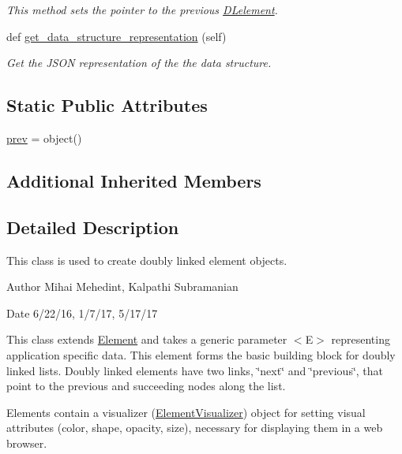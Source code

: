 \begin{DoxyCompactItemize}
\begin{DoxyCompactList}\small\item\em This method sets the pointer to the previous \mbox{\hyperlink{class_bridges_1_1_d_lelement_1_1_d_lelement}{D\+Lelement}}. \end{DoxyCompactList}\item 
def \mbox{\hyperlink{class_bridges_1_1_d_lelement_1_1_d_lelement_ab913276df8a2b51c2d944aaa5b8a9790}{get\+\_\+data\+\_\+structure\+\_\+representation}} (self)
\begin{DoxyCompactList}\small\item\em Get the J\+S\+ON representation of the the data structure. \end{DoxyCompactList}\end{DoxyCompactItemize}
\subsection*{Static Public Attributes}
\begin{DoxyCompactItemize}
\item 
\mbox{\hyperlink{class_bridges_1_1_d_lelement_1_1_d_lelement_a08e7ba4d3ea7b49409b470752ca75ad1}{prev}} = object()
\end{DoxyCompactItemize}
\subsection*{Additional Inherited Members}


\subsection{Detailed Description}
This class is used to create doubly linked element objects. 

\begin{DoxyAuthor}{Author}
Mihai Mehedint, Kalpathi Subramanian
\end{DoxyAuthor}
\begin{DoxyDate}{Date}
6/22/16, 1/7/17, 5/17/17
\end{DoxyDate}
This class extends \mbox{\hyperlink{namespace_bridges_1_1_element}{Element}} and takes a generic parameter $<$\+E$>$ representing application specific data. This element forms the basic building block for doubly linked lists. Doubly linked elements have two links, \char`\"{}next\char`\"{} and \char`\"{}previous\char`\"{}, that point to the previous and succeeding nodes along the list.

Elements contain a visualizer (\mbox{\hyperlink{namespace_bridges_1_1_element_visualizer}{Element\+Visualizer}}) object for setting visual attributes (color, shape, opacity, size), necessary for displaying them in a web browser.

